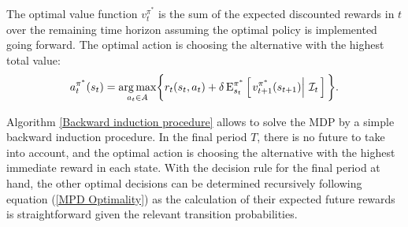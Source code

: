 \noindent The optimal value function $v^{\pi^*}_t$ is the sum of the expected discounted rewards in $t$ over the remaining time horizon assuming the optimal policy is implemented going forward. The optimal action is choosing the alternative with the highest total value:
%
\begin{align*}
a^{\pi^*}_t(s_t) = \underset{a_t\in A}{\operatorname*{arg\,max}} \bigg\{ r_t(s_t, a_t) + \delta\,\mathrm{E}^{\pi^*}_{s_t} \left[\left.v^{\pi^*}_{t + 1}(s_{t + 1})\right\vert\,\mathcal{I}_t\,\right] \bigg\}.\\
\end{align*}

\noindent Algorithm \ref{Backward induction procedure} allows to solve the MDP by a simple backward induction procedure. In the final period $T$, there is no future to take into account, and the optimal action is choosing the alternative with the highest immediate reward in each state. With the decision rule for the final period at hand, the other optimal decisions can be determined recursively following equation (\ref{MPD Optimality}) as the calculation of their expected future rewards is straightforward given the relevant transition probabilities.

\vspace{0.5cm}\FloatBarrier
